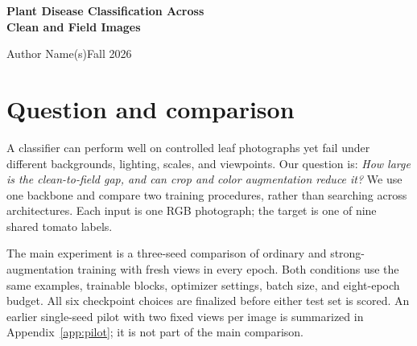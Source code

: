 \documentclass[11pt,letterpaper]{article}
\newcommand{\TeamMembers}{Author Name(s)}   %
\newcommand{\ReportDate}{Fall 2026}
\begin{document}
\begin{center}
{\Large\bfseries Plant Disease Classification Across\\Clean and Field Images}\par
\vspace{.5em}\TeamMembers\quad\ReportDate
\end{center}

\begin{abstract}
We ask how much a classifier trained on controlled tomato-leaf photographs loses on field images, and whether strong crop and color augmentation reduces that loss. We fine-tune an ImageNet-pretrained MobileNetV3-Small under two matched conditions, ordinary and strong augmentation, using three paired seeds and newly sampled image views in every epoch (six models in total). The official PlantVillage split and all training budgets are fixed, and checkpoint selection uses only PlantVillage validation. Ordinary training reaches $\FreshOrdCleanAcc\pm\FreshOrdCleanAccSD$\% clean accuracy and $\FreshOrdFieldAcc\pm\FreshOrdFieldAccSD$\% field accuracy. Strong augmentation reaches $\FreshAugCleanAcc\pm\FreshAugCleanAccSD$\% and $\FreshAugFieldAcc\pm\FreshAugFieldAccSD$\%, respectively (mean $\pm$ sample SD over seeds). The mean paired field changes are $\FreshDeltaAcc$ percentage points in accuracy and $\FreshDeltaFone$ in macro-F1. \FreshConclusion\ Absolute field performance remains low: a training-only majority-class classifier reaches 10.11\% field accuracy. An earlier single-seed pilot is summarized in Appendix~\ref{app:pilot}. Code, checkpoints, per-image predictions, audits, and an executed Notebook accompany the report.
\end{abstract}

\section{Question and comparison}
A classifier can perform well on controlled leaf photographs yet fail under different backgrounds, lighting, scales, and viewpoints. Our question is: \emph{How large is the clean-to-field gap, and can crop and color augmentation reduce it?} We use one backbone and compare two training procedures, rather than searching across architectures. Each input is one RGB photograph; the target is one of nine shared tomato labels.

The main experiment is a three-seed comparison of ordinary and strong-augmentation training with fresh views in every epoch. Both conditions use the same examples, trainable blocks, optimizer settings, batch size, and eight-epoch budget. All six checkpoint choices are finalized before either test set is scored. An earlier single-seed pilot with two fixed views per image is summarized in Appendix~\ref{app:pilot}; it is not part of the main comparison.
\end{document}
